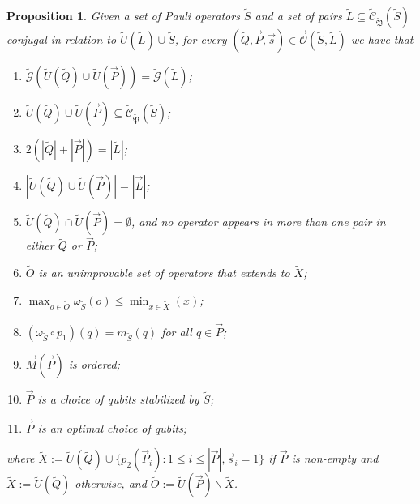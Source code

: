 \documentclass[12pt]{amsbook}
\theoremstyle{plain}
\newtheorem{proposition}{Proposition}
\theoremstyle{definition}
\theoremstyle{remark}
\newcommand{\lst}{\vec}
\newcommand{\set}{\tilde}
\newcommand{\genfun}{\tilde{\mathcal{G}}}
\newcommand{\pauligroup}{{\set{\mathfrak{P}}}}
\newcommand{\centralizer}{\set{\mathcal{C}}}
\newcommand{\unpack}{\set U}
\newcommand{\optimizer}{\lst{\mathcal{O}}}
\newcommand{\om}{\omega}
\newcommand{\paren}[1]{\left(#1\right)}
\begin{document}
\begin{proposition}
\label{proposition:properties of the algorithm}
Given a set of Pauli operators $\set S$ and a set of pairs $\set L\subseteq\centralizer_\pauligroup(\set S)$ conjugal in relation to $\set U(\set L)\cup\set S$, for every $(\set Q,\lst P,\lst s)\in\optimizer(\set S,\set L)$ we have that
\begin{enumerate}
\item $\genfun\paren{\set U(\set Q)\cup\set U(\lst P)}=\genfun(\set L)$;
\item $\set U(\set Q)\cup\set U(\lst P)\subseteq\centralizer_\pauligroup(\set S)$;
\item $2(|\set Q|+|\lst P|)=|\set L|$;
\item $|\set U(\set Q)\cup\set U(\lst P)|=|\lst L|$;
\item $\set U(\set Q)\cap\set U(\lst P)=\emptyset$, and no operator appears in more than one pair in either $\set Q$ or $\lst P$;
\item $\set O$ is an unimprovable set of operators that extends to $\set X$;
\item $\max_{o\in\set O}\om_{\set S}(o)\le\min_{x\in\set X}(x)$;
\item $(\om_{\set S}\circ p_1)(q)=m_{\set S}(q)$ for all $q\in\lst P$;
\item $\lst M(\lst P)$ is ordered;
\item $\lst P$ is a choice of qubits stabilized by $\set S$;
\item $\lst P$ is an optimal choice of qubits;
\end{enumerate}
where $\set X := \unpack(\set Q)\cup\{p_2(\lst P_i):1 \le i \le |\lst P|, \lst s_i=1\}$ if $\lst P$ is non-empty and $\set X := \unpack(\set Q)$ otherwise, and $\set O:=\unpack(\lst P)\backslash\set X$.
\end{proposition}
\end{document}
